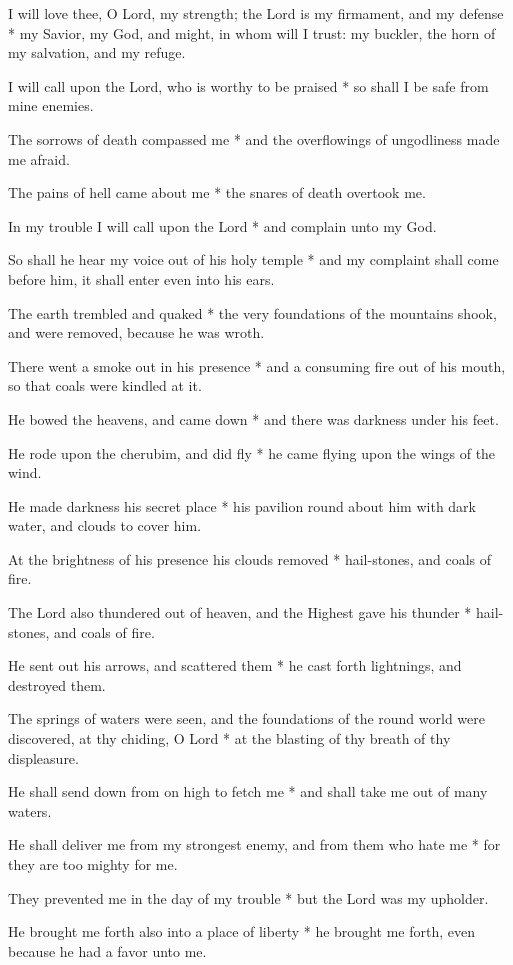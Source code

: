 I will love thee, O Lord, my strength; the Lord is my firmament, and my defense * my Savior, my God, and might, in whom will I trust: my buckler, the horn of my salvation, and my refuge.

I will call upon the Lord, who is worthy to be praised * so shall I be safe from mine enemies.

The sorrows of death compassed me * and the overflowings of ungodliness made me afraid.

The pains of hell came about me * the snares of death overtook me.

In my trouble I will call upon the Lord * and complain unto my God.

So shall he hear my voice out of his holy temple * and my complaint shall come before him, it shall enter even into his ears.

The earth trembled and quaked * the very foundations of the mountains shook, and were removed, because he was wroth.

There went a smoke out in his presence * and a consuming fire out of his mouth, so that coals were kindled at it.

He bowed the heavens, and came down * and there was darkness under his feet.

He rode upon the cherubim, and did fly * he came flying upon the wings of the wind.

He made darkness his secret place * his pavilion round about him with dark water, and clouds to cover him.

At the brightness of his presence his clouds removed * hail-stones, and coals of fire.

The Lord also thundered out of heaven, and the Highest gave his thunder * hail-stones, and coals of fire.

He sent out his arrows, and scattered them * he cast forth lightnings, and destroyed them.

The springs of waters were seen, and the foundations of the round world were discovered, at thy chiding, O Lord * at the blasting of thy breath of thy displeasure.

He shall send down from on high to fetch me * and shall take me out of many waters.

He shall deliver me from my strongest enemy, and from them who hate me * for they are too mighty for me.

They prevented me in the day of my trouble * but the Lord was my upholder.

He brought me forth also into a place of liberty * he brought me forth, even because he had a favor unto me.

